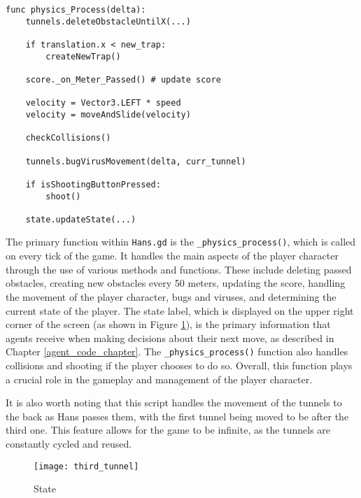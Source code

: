 \begin{center}
\hrulefill
\begin{lstlisting}
func physics_Process(delta):
    tunnels.deleteObstacleUntilX(...)
    
    if translation.x < new_trap:
        createNewTrap()
        
    score._on_Meter_Passed() # update score
    
    velocity = Vector3.LEFT * speed
    velocity = moveAndSlide(velocity)
    
    checkCollisions()
    
    tunnels.bugVirusMovement(delta, curr_tunnel)
    
    if isShootingButtonPressed:
        shoot()
        
    state.updateState(...)
\end{lstlisting}
\hrulefill
\end{center}

The primary function within \texttt{Hans.gd} is the \texttt{\_physics\_process()}, which is called on every tick of the game. It handles the main aspects of the player character through the use of various methods and functions. These include deleting passed obstacles, creating new obstacles every 50 meters, updating the score, handling the movement of the player character, bugs and viruses, and determining the current state of the player. The state label, which is displayed on the upper right corner of the screen (as shown in Figure \ref{fig:third_tunnel}), is the primary information that agents receive when making decisions about their next move, as described in Chapter \ref{agent_code_chapter}. The \texttt{\_physics\_process()} function also handles collisions and shooting if the player chooses to do so. Overall, this function plays a crucial role in the gameplay and management of the player character.

It is also worth noting that this script handles the movement of the tunnels to the back as Hans passes them, with the first tunnel being moved to be after the third one. This feature allows for the game to be infinite, as the tunnels are constantly cycled and reused.

\begin{figure}[h]
    \centering
    \texttt{[image: third\_tunnel]}
    \caption{State}
    \label{fig:third_tunnel}
\end{figure}

